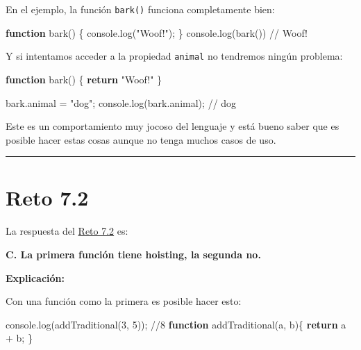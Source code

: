 \documentclass[
  letterpaper,
  DIV=11,
  numbers=noendperiod]{scrreprt}
\newenvironment{Shaded}{\begin{snugshade}}{\end{snugshade}}
\newcommand{\AttributeTok}[1]{\textcolor[rgb]{0.40,0.45,0.13}{#1}}
\newcommand{\BuiltInTok}[1]{\textcolor[rgb]{0.00,0.23,0.31}{#1}}
\newcommand{\CommentTok}[1]{\textcolor[rgb]{0.37,0.37,0.37}{#1}}
\newcommand{\ControlFlowTok}[1]{\textcolor[rgb]{0.00,0.23,0.31}{\textbf{#1}}}
\newcommand{\DecValTok}[1]{\textcolor[rgb]{0.68,0.00,0.00}{#1}}
\newcommand{\FunctionTok}[1]{\textcolor[rgb]{0.28,0.35,0.67}{#1}}
\newcommand{\KeywordTok}[1]{\textcolor[rgb]{0.00,0.23,0.31}{\textbf{#1}}}
\newcommand{\NormalTok}[1]{\textcolor[rgb]{0.00,0.23,0.31}{#1}}
\newcommand{\OperatorTok}[1]{\textcolor[rgb]{0.37,0.37,0.37}{#1}}
\newcommand{\StringTok}[1]{\textcolor[rgb]{0.13,0.47,0.30}{#1}}
\begin{document}
En el ejemplo, la función \texttt{bark()} funciona completamente bien:

\begin{Shaded}
\begin{Highlighting}[]
\KeywordTok{function} \FunctionTok{bark}\NormalTok{() \{}
  \BuiltInTok{console}\OperatorTok{.}\FunctionTok{log}\NormalTok{(}\StringTok{"Woof!"}\NormalTok{)}\OperatorTok{;}
\NormalTok{\}}
\BuiltInTok{console}\OperatorTok{.}\FunctionTok{log}\NormalTok{(}\FunctionTok{bark}\NormalTok{()) }\CommentTok{// Woof!}
\end{Highlighting}
\end{Shaded}

Y si intentamos acceder a la propiedad \texttt{animal} no tendremos
ningún problema:

\begin{Shaded}
\begin{Highlighting}[]
\KeywordTok{function} \FunctionTok{bark}\NormalTok{() \{}
  \ControlFlowTok{return} \StringTok{"Woof!"}
\NormalTok{\}}

\NormalTok{bark}\OperatorTok{.}\AttributeTok{animal} \OperatorTok{=} \StringTok{"dog"}\OperatorTok{;}
\BuiltInTok{console}\OperatorTok{.}\FunctionTok{log}\NormalTok{(bark}\OperatorTok{.}\AttributeTok{animal}\NormalTok{)}\OperatorTok{;} \CommentTok{// dog}
\end{Highlighting}
\end{Shaded}

Este es un comportamiento muy jocoso del lenguaje y está bueno saber que
es posible hacer estas cosas aunque no tenga muchos casos de uso.

\begin{center}\rule{0.5\linewidth}{0.5pt}\end{center}

\section{Reto 7.2}\label{sec-sol-cap7-reto2}

La respuesta del \hyperref[sec-cap7-reto2]{Reto 7.2} es:

\textbf{C. La primera función tiene hoisting, la segunda no.}

\textbf{Explicación:}

Con una función como la primera es posible hacer esto:

\begin{Shaded}
\begin{Highlighting}[]
\BuiltInTok{console}\OperatorTok{.}\FunctionTok{log}\NormalTok{(}\FunctionTok{addTraditional}\NormalTok{(}\DecValTok{3}\OperatorTok{,} \DecValTok{5}\NormalTok{))}\OperatorTok{;} \CommentTok{//8}
\KeywordTok{function} \FunctionTok{addTraditional}\NormalTok{(a}\OperatorTok{,}\NormalTok{ b)\{}
  \ControlFlowTok{return}\NormalTok{ a }\OperatorTok{+}\NormalTok{ b}\OperatorTok{;}
\NormalTok{\}}
\end{Highlighting}
\end{Shaded}
\end{document}
